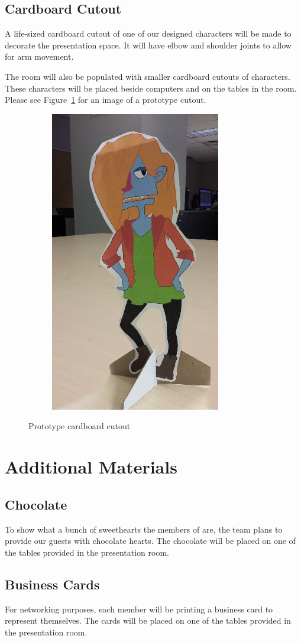 \documentclass{GlobalDocument}
\begin{document}
\section{Cardboard Cutout}
A life-sized cardboard cutout of one of our designed characters will be made to decorate the presentation space. It will have elbow and shoulder joints to allow for arm movement. 

The room will also be populated with smaller cardboard cutouts of characters. These characters will be placed beside computers and on the tables in the room. Please see Figure~\ref{fig:cutout} for an image of a prototype cutout.

\begin{figure}[htb]
	\centering\begin{subfigure}{.45\textwidth}
	\includegraphics{images/cutout}
	\end{subfigure}
	\caption{Prototype cardboard cutout}
	\label{fig:cutout}
\end{figure}

\chapter{Additional Materials}
\section{Chocolate}
To show what a bunch of sweethearts the members of \ourteam{} are, the team plans to provide our guests with chocolate hearts. The chocolate will be placed on one of the tables provided in the presentation room.

\section{Business Cards}
For networking purposes, each member will be printing a business card to represent themselves. The cards will be placed on one of the tables provided in the presentation room.
\end{document}
